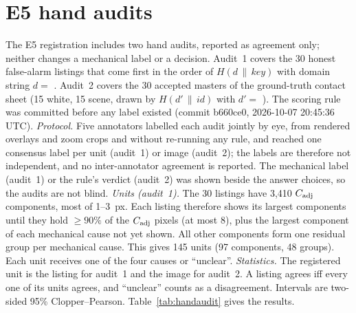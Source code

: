 \documentclass[10pt]{article}
\begin{document}
\section{E5 hand audits}
\label{sec:handaudit}
The E5 registration includes two hand audits, reported as agreement only; neither changes a mechanical label or
a decision. Audit~1 covers the 30 honest false-alarm listings that come first in the order of
$H(d\,\|\,\mathit{key})$ with domain string $d=$ . Audit~2 covers the 30 accepted
masters of the ground-truth contact sheet (15 white, 15 scene, drawn by $H(d'\,\|\,\mathit{id})$ with
$d'=$ ). The scoring rule
was committed before any label existed (commit b660ce0, 2026-10-07 20:45:36 UTC).
\emph{Protocol.} Five annotators labelled each audit jointly by eye, from rendered overlays and zoom crops and without
re-running any rule, and reached one consensus label per unit (audit~1) or image (audit~2); the labels are therefore
not independent, and no inter-annotator agreement is reported. The mechanical label (audit~1) or the rule's verdict
(audit~2) was shown beside the answer choices, so the audits are not blind.
\emph{Units (audit~1).} The 30 listings have 3,410 $C_{\mathrm{adj}}$ components, most of 1--3~px. Each listing therefore shows
its largest components until they hold $\ge90\%$ of the $C_{\mathrm{adj}}$ pixels (at most 8), plus the largest component of each
mechanical cause not yet shown. All other components form one residual group per mechanical cause. This gives 145
units (97 components, 48 groups). Each unit receives one of the four causes or ``unclear''.
\emph{Statistics.} The registered unit is the listing for audit~1 and the image for audit~2. A listing agrees iff
every one of its units agrees, and ``unclear'' counts as a disagreement. Intervals are two-sided 95\%
Clopper--Pearson. Table~\ref{tab:handaudit} gives the results.
\end{document}
